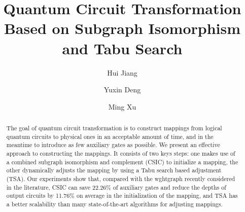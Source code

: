 \documentclass[runningheads]{llncs}
\begin{document}
%
\title{ Quantum Circuit Transformation Based on Subgraph Isomorphism and Tabu Search%
}

\author{Hui Jiang %
	\and
Yuxin Deng
\and Ming Xu
}
%

%

\maketitle              %
%
\begin{abstract}
	The goal of quantum circuit transformation is to construct mappings from logical quantum circuits to physical ones in an acceptable amount of time, and in the meantime to introduce  as few auxiliary gates as possible. We present an effective approach to constructing the mappings. It consists of two keys steps: one makes use of a combined subgraph isomorphism and complement (CSIC) to initialize a mapping, the other dynamically adjusts the mapping by using a Tabu search based adjustment (TSA). Our experiments show that, compared with the wghtgraph recently considered in the literature, CSIC can save 22.26\% of auxiliary gates and reduce the depths of output circuits by 11.76\% on average in the initialization of the mapping, and  TSA has a better scalability than many state-of-the-art algorithms for adjusting mappings.
\end{abstract}

	
\end{document}
